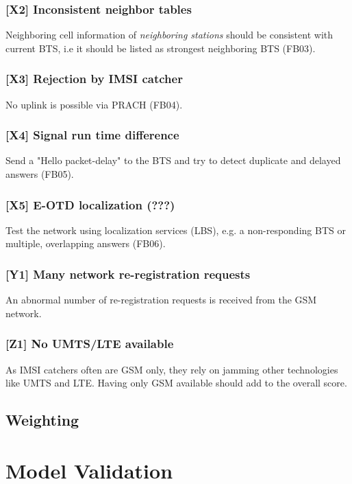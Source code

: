 \documentclass[a4paper,11pt,notitlepage,bigheadings,oneside]{scrartcl}
\begin{document}
\subsubsection{[X2] Inconsistent neighbor tables}

Neighboring cell information of \emph{neighboring stations} should be
consistent with current BTS, i.e it should be listed as strongest neighboring
BTS (FB03).


\subsubsection{[X3] Rejection by IMSI catcher}

No uplink is possible via PRACH (FB04). 

\subsubsection{[X4] Signal run time difference}

Send a "Hello packet-delay" to the BTS and try to detect duplicate and delayed
answers (FB05).

\subsubsection{[X5] E-OTD localization (???)}

Test the network using localization services (LBS), e.g. a non-responding BTS
or multiple, overlapping answers (FB06).

\subsubsection{[Y1] Many network re-registration requests}

An abnormal number of re-registration requests is received from the GSM
network.

\subsubsection{[Z1] No UMTS/LTE available}

As IMSI catchers often are GSM only, they rely on jamming other technologies
like UMTS and LTE. Having only GSM available should add to the overall score.

\subsection{Weighting}

\section{Model Validation}



\end{document}
